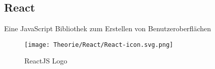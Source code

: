 \subsection{React}
\label{reactjs}
Eine JavaScript Bibliothek zum Erstellen von Benutzeroberflächen

\begin{figure}[H]
  \begin{center}
    \texttt{[image: Theorie/React/React-icon.svg.png]}
    \caption{ReactJS Logo \cite{reactjs}}
  \end{center}
\end{figure}


